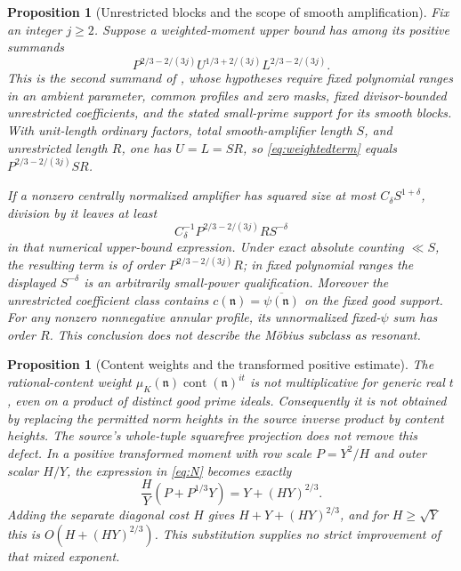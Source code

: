 \documentclass[11pt]{article}
\newtheorem{proposition}[theorem]{Proposition}
\theoremstyle{remark}\newtheorem{remark}[theorem]{Remark}
\DeclareMathOperator{\cont}{cont}
\begin{document}
\begin{proposition}[Unrestricted blocks and the scope of smooth amplification]\label{prop:block}
Fix an integer $j\ge2$. Suppose a weighted-moment upper bound has among its positive summands
\begin{equation}
P^{2/3-2/(3j)}U^{1/3+2/(3j)}L^{2/3-2/(3j)}.
\label{eq:weightedterm}
\end{equation}
This is the second summand of \citet[Proposition~7, (14.3)]{bt55v2}, whose hypotheses require fixed polynomial ranges in an ambient parameter, common profiles and zero masks, fixed divisor-bounded unrestricted coefficients, and the stated small-prime support for its smooth blocks. With unit-length ordinary factors, total smooth-amplifier length $S$, and unrestricted length $R$, one has $U=L=SR$, so \eqref{eq:weightedterm} equals $P^{2/3-2/(3j)}SR$.

If a nonzero centrally normalized amplifier has squared size at most $C_\delta S^{1+\delta}$, division by it leaves at least
\[
C_\delta^{-1}P^{2/3-2/(3j)}RS^{-\delta}
\]
in that numerical upper-bound expression. Under exact absolute counting $\ll S$, the resulting term is of order $P^{2/3-2/(3j)}R$; in fixed polynomial ranges the displayed $S^{-\delta}$ is an arbitrarily small-power qualification. Moreover the unrestricted coefficient class contains $c(\mathfrak n)=\overline{\psi(\mathfrak n)}$ on the fixed good support. For any nonzero nonnegative annular profile, its unnormalized fixed-$\psi$ sum has order $R$. This conclusion does not describe the Möbius subclass as resonant.
\end{proposition}

\begin{proposition}[Content weights and the transformed positive estimate]\label{prop:content}
The rational-content weight $\mu_K(\mathfrak n)\cont(\mathfrak n)^{it}$ is not multiplicative for generic real $t$, even on a product of distinct good prime ideals. Consequently it is not obtained by replacing the permitted norm heights in the source inverse product by content heights. The source's whole-tuple squarefree projection does not remove this defect. In a positive transformed moment with row scale $P=Y^2/H$ and outer scalar $H/Y$, the expression in \eqref{eq:N} becomes exactly
\[
\frac HY(P+P^{1/3}Y)=Y+(HY)^{2/3}.
\]
Adding the separate diagonal cost $H$ gives $H+Y+(HY)^{2/3}$, and for $H\ge\sqrt Y$ this is $O(H+(HY)^{2/3})$. This substitution supplies no strict improvement of that mixed exponent.
\end{proposition}
\end{document}
